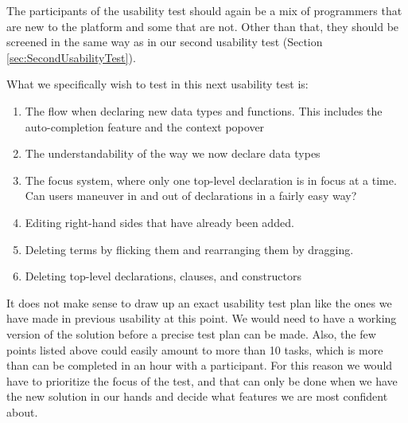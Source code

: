 The participants of the usability test should again be a mix of programmers
that are new to the platform and some that are not. Other than that, they
should be screened in the same way as in our second usability test (Section
\ref{sec:SecondUsabilityTest}).

What we specifically wish to test in this next usability test is:

\begin{enumerate}
	\item The flow when declaring new data types and functions. This includes the auto-completion feature and the context popover
	\item The understandability of the way we now declare data types
	\item The focus system, where only one top-level declaration is in focus at a
	time. Can users maneuver in and out of declarations in a fairly easy way?
	\item Editing right-hand sides that have already been added.
	\item Deleting terms by flicking them and rearranging them by dragging.
	\item Deleting top-level declarations, clauses, and constructors
\end{enumerate}

It does not make sense to draw up an exact usability test plan like the ones we have made in previous usability
at this point. We would need to have a working version of the solution before a precise test plan can be made. Also, the few points listed above could easily amount to more than 10 tasks, which is more than can be completed in an hour with a participant. For this reason we would have to prioritize the focus of the test, and that can only be done when we have the new solution in our hands and decide what features we are most confident about. 




